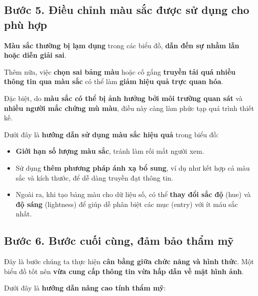\subsection{Bước 5. Điều chỉnh màu sắc được sử dụng cho phù
hợp}\label{bux1b0ux1edbc-5.-ux111iux1ec1u-chux1ec9nh-muxe0u-sux1eafc-ux111ux1b0ux1ee3c-sux1eed-dux1ee5ng-cho-phuxf9-hux1ee3p}

\textbf{Màu sắc thường bị lạm dụng} trong các biểu đồ, \textbf{dẫn đến
sự nhầm lẫn hoặc diễn giải sai}.

Thêm nữa, việc \textbf{chọn sai bảng màu} hoặc cố gắng \textbf{truyền
tải quá nhiều thông tin qua màu sắc} có thể làm \textbf{giảm hiệu quả
trực quan hóa}.

Đặc biệt, do \textbf{màu sắc có thể bị ảnh hưởng bởi môi trường quan
sát} và \textbf{nhiều người mắc chứng mù màu}, điều này càng làm phức
tạp quá trình thiết kế.

Dưới đây là \textbf{hướng dẫn sử dụng màu sắc hiệu quả} trong biểu đồ:

\begin{itemize}
\item
  \textbf{Giới hạn số lượng màu sắc}, tránh làm rối mắt người xem.
\item
  Sử dụng \textbf{thêm phương pháp ánh xạ bổ sung}, ví dụ như kết hợp cả
  màu sắc và kích thước, để dễ dàng truyền đạt thông tin.
\item
  Ngoài ra, khi tạo bảng màu cho dữ liệu số, có thể \textbf{thay đổi sắc
  độ} (hue) và \textbf{độ sáng} (lightness) để giúp dễ phân biệt các mục
  (entry) với ít máu sắc nhất.
\end{itemize}

\subsection{Bước 6. Bước cuối cùng, đảm bảo thẩm
mỹ}\label{bux1b0ux1edbc-6.-bux1b0ux1edbc-cuux1ed1i-cuxf9ng-ux111ux1ea3m-bux1ea3o-thux1ea9m-mux1ef9}

Đây là bước chúng ta thực hiện \textbf{cân bằng giữa chức năng và hình
thức}. Một biểu đồ tốt nên \textbf{vừa cung cấp thông tin vừa hấp dẫn về
mặt hình ảnh}.

Dưới đây là \textbf{hướng dẫn nâng cao tính thẩm mỹ}:

